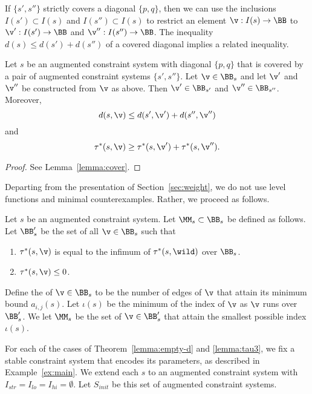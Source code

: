 If   $\{s',s''\}$ strictly covers a diagonal $\{p,q\}$, then we can use the inclusions
$I(s')\subset I(s)$ and $I(s'')\subset I(s)$ to restrict an element $\v:I(s)\to\BB$ to
$\v':I(s')\to \BB$ and $\v'':I(s'')\to \BB$.
The inequality $d(s)\le d(s') + d(s'')$ of a covered diagonal
implies a related inequality.

\begin{lemma}\label{lemma:cover2}
Let $s$ be an augmented constraint system with diagonal $\{p,q\}$ that is covered
by a pair of augmented constraint systems $\{s',s''\}$. 
Let $\v\in \BB_s$ and let $\v'$ and $\v''$ be constructed from $\v$ as above.
Then  $\v'\in \BB_{s'}$ and $\v''\in \BB_{s''}$.
Moreover,
\begin{equation}
d(s,\v) \le d(s',\v') + d(s'',\v'')
\end{equation}
and
\begin{equation}
\tau^*(s,\v)\ge \tau^*(s,\v')+\tau^*(s,\v'').
\end{equation}
\end{lemma}

\begin{proof} See Lemma~\ref{lemma:cover}.
\end{proof}

Departing from the presentation of Section~\ref{sec:weight}, we do not
use level functions and minimal counterexamples.  Rather, we proceed
as follows.


\begin{definition} 
Let $s$ be an augmented constraint system.
Let $\MM_{s}\subset \BB_{s}$ be defined as follows.
Let $\BB'_{s}$ be the set of all $\v\in \BB_{s}$ such that
\begin{enumerate}
\item $\tau^*(s,\v)$ is equal to the infimum of $\tau^*(s,\wild)$ over $\BB_{s}$.
\item $\tau^*(s,\v)\le 0$.
\end{enumerate}
Define the  of $\v\in \BB_s$ to be the number of edges of $\v$
that attain its minimum bound $a_{i,j}(s)$.  Let $\iota(s)$ be the minimum
of the index of $\v$ as $\v$ runs over $\BB'_s$.  
We let $\MM_{s}$  be the set of $\v\in \BB'_{s}$ that attain
the smallest possible index $\iota(s)$.
\end{definition}

\begin{definition}[$S_{init}$] 
For each of the cases of Theorem~\ref{lemma:empty-d} and \ref{lemma:tau3}, we fix a
stable constraint system that encodes its parameters, as described in Example~\ref{ex:main}. 
We extend each $s$ to an augmented constraint system with $I_{str}=I_{lo}=I_{hi}=\emptyset$.
Let $S_{init}$ be this set of  augmented constraint systems.
\end{definition}

